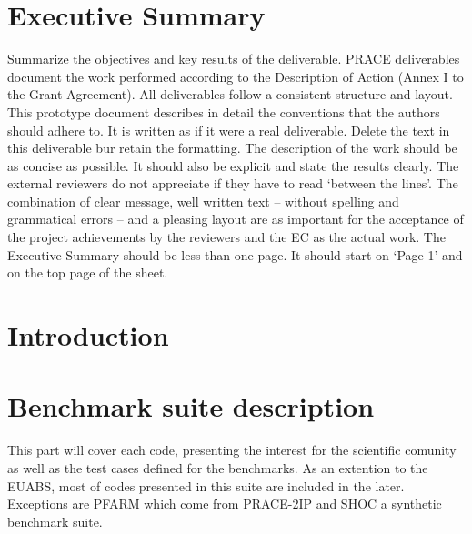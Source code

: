 \part*{Executive Summary}
Summarize the objectives and key results of the deliverable.
PRACE deliverables document the work performed according to the Description of Action (Annex I to the Grant Agreement). All deliverables follow a consistent structure and layout. This prototype document describes in detail the conventions that the authors should adhere to. It is written as if it were a real deliverable. Delete the text in this deliverable bur retain the formatting.
The description of the work should be as concise as possible. It should also be explicit and state the results clearly. The external reviewers do not appreciate if they have to read ‘between the lines’. The combination of clear message, well written text – without spelling and grammatical errors – and a pleasing layout are as important for the acceptance of the project achievements by the reviewers and the EC as the actual work.
The Executive Summary should be less than one page. It should start on ‘Page 1’ and on the top page of the sheet.


\part{Introduction}


\part{Benchmark suite description}
This part will cover each code, presenting the interest for the scientific comunity as well as the test cases defined for the benchmarks.
As an extention to the EUABS, \ref{} most of codes presented in this suite are included in the later. Exceptions are PFARM which come from PRACE-2IP \ref{} and SHOC a synthetic benchmark suite.
